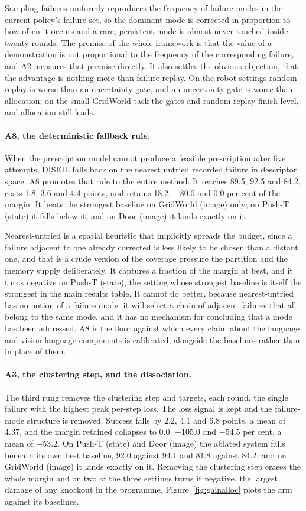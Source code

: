 \documentclass[letterpaper]{article}
\begin{document}
Sampling failures uniformly reproduces the frequency of failure modes in the current
policy's failure set, so the dominant mode is corrected in proportion to how often it
occurs and a rare, persistent mode is almost never touched inside twenty rounds. The
premise of the whole framework is that the value of a demonstration is not proportional
to the frequency of the corresponding failure, and A2 measures that premise directly.
It also settles the obvious objection, that the advantage is nothing more than failure
replay. On the robot settings random replay is worse than an uncertainty gate, and an
uncertainty gate is worse than allocation; on the small GridWorld task the gates and
random replay finish level, and allocation still leads.

\paragraph{A8, the deterministic fallback rule.} When the prescription model cannot
produce a feasible prescription after five attempts, DISEIL falls back on the nearest
untried recorded failure in descriptor space. A8 promotes that rule to the entire
method. It reaches 89.5, 92.5 and 84.2, costs 1.8, 3.6 and 4.4 points, and retains
18.2, $-80.0$ and 0.0 per cent of the margin. It beats the strongest baseline on
GridWorld (image) only; on Push-T (state) it falls below it, and on Door (image) it
lands exactly on it.

Nearest-untried is a spatial heuristic that implicitly spreads the budget, since a
failure adjacent to one already corrected is less likely to be chosen than a distant
one, and that is a crude version of the coverage pressure the partition and the memory
supply deliberately. It captures a fraction of the margin at best, and it turns
negative on Push-T (state), the setting whose strongest baseline is itself the
strongest in the main results table. It cannot do better, because nearest-untried has
no notion of a failure mode: it will select a chain of adjacent failures that all
belong to the same mode, and it has no mechanism for concluding that a mode has been
addressed. A8 is the floor against which every claim about the language and
vision-language components is calibrated, alongside the baselines rather than in place
of them.

\paragraph{A3, the clustering step, and the dissociation.} The third rung removes the
clustering step and targets, each round, the single failure with the highest peak
per-step loss. The loss signal is kept and the failure-mode structure is removed.
Success falls by 2.2, 4.1 and 6.8 points, a mean of 4.37, and the margin retained
collapses to 0.0, $-105.0$ and $-54.5$ per cent, a mean of $-53.2$. On Push-T (state)
and Door (image) the ablated system falls beneath its own best baseline, 92.0 against
94.1 and 81.8 against 84.2, and on GridWorld (image) it lands exactly on it. Removing
the clustering step erases the whole margin and on two of the three settings turns it
negative, the largest damage of any knockout in the programme.
Figure~\ref{fig:gainalloc} plots the arm against its baselines.
\end{document}

